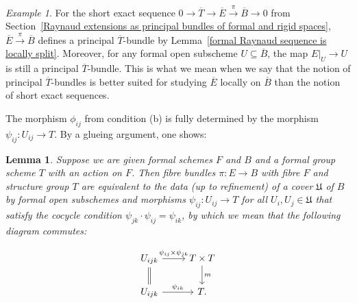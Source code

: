 \documentclass[10pt,oneside]{amsart}
\newtheorem{lemma}[theorem]{Lemma}
\theoremstyle{definition}
\theoremstyle{remark}
\newtheorem*{example}{Example}
\begin{document}
	\begin{example}
		For the short exact sequence $0\rightarrow \overline{T}\rightarrow \overline{E}\xrightarrow{\pi} \overline{B}\rightarrow 0$ from Section~\ref{Raynaud extensions as principal bundles of formal and rigid spaces}, $\overline{E}\xrightarrow{\pi} \overline{B}$ defines a principal $\overline{T}$-bundle by Lemma~\ref{formal Raynaud sequence is locally split}. Moreover, for any formal open subscheme $U\subseteq \overline{B}$, the map $E|_U\rightarrow U$ is still a principal $\overline{T}$-bundle. This is what we mean when we say that the notion of principal $\overline{T}$-bundles is better suited for studying $\overline{E}$ locally on $\overline{B}$ than the notion of short exact sequences.
	\end{example}
	
	The morphism $\phi_{ij}$ from condition (b) is fully determined by the morphism $\psi_{ij}:U_{ij}\rightarrow T$. By a glueing argument, one shows:
	\begin{lemma}\label{equivalent characterisation of principal $T$-bundle}
		Suppose we are given formal schemes $F$ and $B$ and a formal group scheme $T$ with an action on $F$. Then fibre bundles $\pi:E\rightarrow B$ with fibre $F$ and structure group $T$ are equivalent to the data (up to refinement) of a cover $\mathfrak U$ of $B$ by formal open subschemes and morphisms $\psi_{ij}:U_{ij}\rightarrow T$ for all $U_i,U_j\in \mathfrak U$ that satisfy the cocycle condition $\psi_{jk}\cdot \psi_{ij}=\psi_{ik}$, by which we mean that the following diagram commutes:
		
		\begin{center}\begin{equation}		\label{cocycle condition of fibre bundle}
			\begin{tikzcd}
			U_{ijk} \arrow[r, "\psi_{ij}\times\psi_{jk}"] \arrow[d,equal] & T\times T \arrow[d, "m"] \\
			U_{ijk} \arrow[r, "\psi_{ik}"] & T.
			\end{tikzcd}
			\end{equation}
		\end{center}
	\end{lemma}
	
\end{document}
